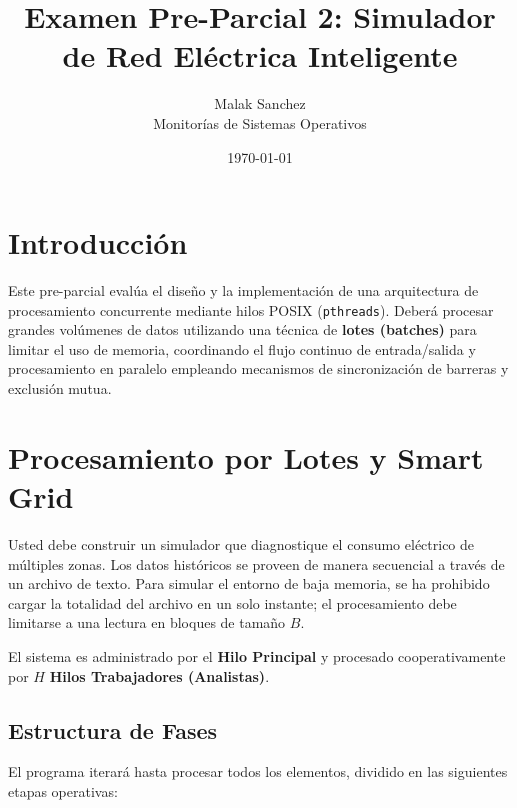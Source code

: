 \documentclass[12pt,a4paper]{article}
\title{\textbf{Examen Pre-Parcial 2: Simulador de Red Eléctrica Inteligente}}
\author{Malak Sanchez \\ \small Monitorías de Sistemas Operativos}
\date{\today}
\begin{document}
\maketitle

\section*{Introducción}
Este pre-parcial evalúa el diseño y la implementación de una arquitectura de procesamiento concurrente mediante hilos POSIX (\texttt{pthreads}). Deberá procesar grandes volúmenes de datos utilizando una técnica de \textbf{lotes (batches)} para limitar el uso de memoria, coordinando el flujo continuo de entrada/salida y procesamiento en paralelo empleando mecanismos de sincronización de barreras y exclusión mutua.

\section*{\textbf{Procesamiento por Lotes y Smart Grid}}

Usted debe construir un simulador que diagnostique el consumo eléctrico de múltiples zonas. Los datos históricos se proveen de manera secuencial a través de un archivo de texto. Para simular el entorno de baja memoria, se ha prohibido cargar la totalidad del archivo en un solo instante; el procesamiento debe limitarse a una lectura en bloques de tamaño $B$.

El sistema es administrado por el \textbf{Hilo Principal} y procesado cooperativamente por $H$ \textbf{Hilos Trabajadores (Analistas)}.

\subsection*{Estructura de Fases}
El programa iterará hasta procesar todos los elementos, dividido en las siguientes etapas operativas:
\end{document}
